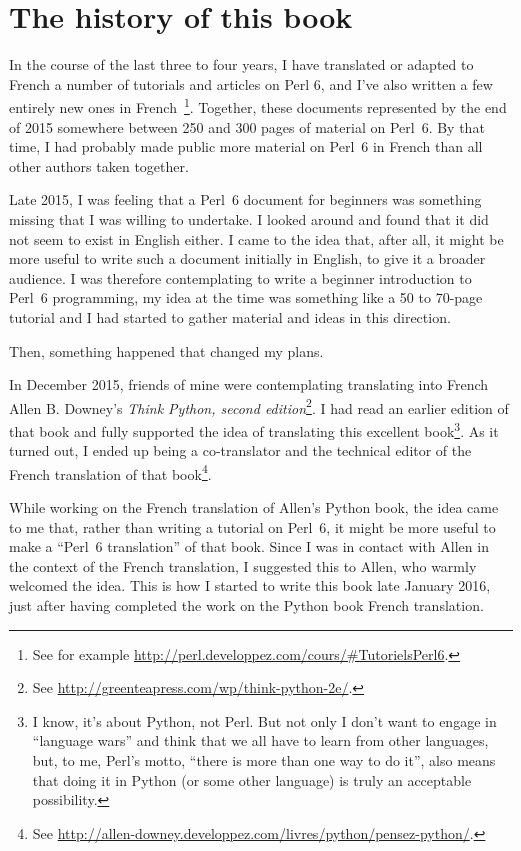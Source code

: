 \section*{The history of this book}

In the course of the last three to four years, I  
have translated or adapted to French a number of tutorials 
and articles on Perl 6, and I've also written a few entirely 
new ones in French~\footnote{See for example 
\url{http://perl.developpez.com/cours/\#TutorielsPerl6}.}. 
Together, these documents represented by the end of 2015 
somewhere between 250 and 300 pages of material on Perl~6. 
By that time, I had 
probably made public more material on Perl~6 in French than 
all other authors taken together.

Late 2015, I was feeling that a Perl~6 document for beginners 
was something missing that I was willing to undertake. 
I looked around and found that it did not seem to 
exist in English either. I came to the idea that, after all, 
it might be more useful to write such a document initially 
in English, to give it a broader audience. I was therefore 
contemplating to write a beginner introduction to Perl~6 
programming, my idea at the time was something like a 50 to 
70-page tutorial and I had started to gather material and ideas 
in this direction.

Then, something happened that changed my plans.

In December 2015, friends of mine were contemplating translating 
into French Allen B. Downey's \emph{Think Python, second edition}\footnote{See \url{http://greenteapress.com/wp/think-python-2e/}.}. 
I had read an earlier edition of that book and fully supported 
the idea of translating this excellent book\footnote{I know, it's 
about Python, not Perl. But not only I don't want to engage 
in ``language wars'' and think that we all have to learn from 
other languages, but, to me, Perl's motto, ``there is more than 
one way to do it'', also means that doing it in Python (or some 
other language) is truly an acceptable possibility.}. As it 
turned out, I ended up being a co-translator and the technical 
editor of the French translation of that book\footnote{See 
\url{http://allen-downey.developpez.com/livres/python/pensez-python/}.}.

While working on the French translation of Allen's Python book, 
the idea came to me that, rather than writing a tutorial on 
Perl~6, it might be more useful to make a ``Perl~6 translation'' 
of that book. Since I was in contact with Allen in the context 
of the French translation, I suggested this to Allen, who 
warmly welcomed the idea. This is how I started to write this 
book late January 2016, just after having completed the 
work on the Python book French translation.

